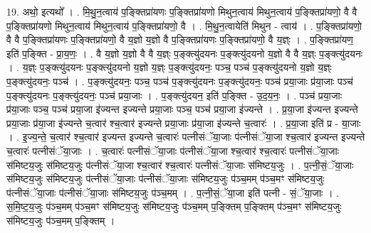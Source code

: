 \documentclass[17pt]{extarticle}
\begin{document}
19. अथो॒ इत्यथो᳚ । . मि॒थु॒न॒त्वाय॑ प॒ङ्क्तिप्रा॑यणः प॒ङ्क्तिप्रा॑यणो मिथुन॒त्वाय॑ मिथुन॒त्वाय॑ प॒ङ्क्तिप्रा॑यणो॒ वै वै प॒ङ्क्तिप्रा॑यणो मिथुन॒त्वाय॑ मिथुन॒त्वाय॑ प॒ङ्क्तिप्रा॑यणो॒ वै । . मि॒थु॒न॒त्वायेति॑ मिथुन - त्वाय॑ । . प॒ङ्क्तिप्रा॑यणो॒ वै वै प॒ङ्क्तिप्रा॑यणः प॒ङ्क्तिप्रा॑यणो॒ वै य॒ज्ञो य॒ज्ञो वै प॒ङ्क्तिप्रा॑यणः प॒ङ्क्तिप्रा॑यणो॒ वै य॒ज्ञ्ः । . प॒ङ्क्तिप्रा॑यण॒ इति॑ प॒ङ्क्ति - प्रा॒य॒णः॒ । . वै य॒ज्ञो य॒ज्ञो वै वै य॒ज्ञ्ः प॒ङ्क्त्यु॑दयनः प॒ङ्क्त्यु॑दयनो य॒ज्ञो वै वै य॒ज्ञ्ः प॒ङ्क्त्यु॑दयनः । . य॒ज्ञ्ः प॒ङ्क्त्यु॑दयनः प॒ङ्क्त्यु॑दयनो य॒ज्ञो य॒ज्ञ्ः प॒ङ्क्त्यु॑दयनः॒ पञ्च॒ पञ्च॑ प॒ङ्क्त्यु॑दयनो य॒ज्ञो य॒ज्ञ्ः प॒ङ्क्त्यु॑दयनः॒ पञ्च॑ । . प॒ङ्क्त्यु॑दयनः॒ पञ्च॒ पञ्च॑ प॒ङ्क्त्यु॑दयनः प॒ङ्क्त्यु॑दयनः॒ पञ्च॑ प्रया॒जाः प्र॑या॒जाः पञ्च॑ प॒ङ्क्त्यु॑दयनः प॒ङ्क्त्यु॑दयनः॒ पञ्च॑ प्रया॒जाः । . प॒ङ्क्त्यु॑दयन॒ इति॑ प॒ङ्क्ति - उ॒द॒य॒नः॒ । . पञ्च॑ प्रया॒जाः प्र॑या॒जाः पञ्च॒ पञ्च॑ प्रया॒जा इ॑ज्यन्त इज्यन्ते प्रया॒जाः पञ्च॒ पञ्च॑ प्रया॒जा इ॑ज्यन्ते । . प्र॒या॒जा इ॑ज्यन्त इज्यन्ते प्रया॒जाः प्र॑या॒जा इ॑ज्यन्ते च॒त्वार॑ श्च॒त्वार॑ इज्यन्ते प्रया॒जाः प्र॑या॒जा इ॑ज्यन्ते च॒त्वारः॑ । . प्र॒या॒जा इति॑ प्र - या॒जाः । . इ॒ज्य॒न्ते॒ च॒त्वार॑ श्च॒त्वार॑ इज्यन्त इज्यन्ते च॒त्वारः॑ पत्नीसंॅया॒जाः प॑त्नीसंॅया॒जा श्च॒त्वार॑ इज्यन्त इज्यन्ते च॒त्वारः॑ पत्नीसंॅया॒जाः । . च॒त्वारः॑ पत्नीसंॅया॒जाः प॑त्नीसंॅया॒जा श्च॒त्वार॑ श्च॒त्वारः॑ पत्नीसंॅया॒जाः स॑मिष्टय॒जुः स॑मिष्टय॒जुः प॑त्नीसंॅया॒जा श्च॒त्वार॑ श्च॒त्वारः॑ पत्नीसंॅया॒जाः स॑मिष्टय॒जुः । . प॒त्नी॒सं॒ॅया॒जाः स॑मिष्टय॒जुः स॑मिष्टय॒जुः प॑त्नीसंॅया॒जाः प॑त्नीसंॅया॒जाः स॑मिष्टय॒जुः प॑ञ्च॒मम् प॑ञ्च॒मꣳ स॑मिष्टय॒जुः प॑त्नीसंॅया॒जाः प॑त्नीसंॅया॒जाः स॑मिष्टय॒जुः प॑ञ्च॒मम् । . प॒त्नी॒सं॒ॅया॒जा इति॑ पत्नी - सं॒ॅया॒जाः । . स॒मि॒ष्ट॒य॒जुः प॑ञ्च॒मम् प॑ञ्च॒मꣳ स॑मिष्टय॒जुः स॑मिष्टय॒जुः प॑ञ्च॒मम् प॒ङ्क्तिम् प॒ङ्क्तिम् प॑ञ्च॒मꣳ स॑मिष्टय॒जुः स॑मिष्टय॒जुः प॑ञ्च॒मम् प॒ङ्क्तिम् । \newline
\end{document}
